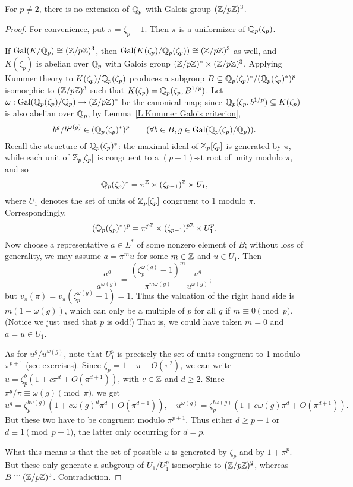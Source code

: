 \begin{lemma} \label{lem:three}
For $p \neq 2$, there is no extension of $\mathbb{Q}_p$ with 
Galois group $(\mathbb{Z}/p\mathbb{Z})^3$.
\end{lemma}
\begin{proof}
For convenience, put $\pi = \zeta_p - 1$. Then $\pi$ is a uniformizer of
$\mathbb{Q}_p(\zeta_p)$.

If $\operatorname{Gal}(K/\mathbb{Q}_p) \cong (\mathbb{Z}/p\mathbb{Z})^3$, then
$\operatorname{Gal}(K(\zeta_p)/\mathbb{Q}_p(\zeta_p)) \cong (\mathbb{Z}/p\mathbb{Z})^3$ as well,
and $K(\zeta_p)$ is abelian over $\mathbb{Q}_p$ with Galois group
$(\mathbb{Z}/p\mathbb{Z})^* \times (\mathbb{Z}/p\mathbb{Z})^3$. Applying
Kummer theory to $K(\zeta_p)/\mathbb{Q}_p(\zeta_p)$ produces a subgroup $B
\subseteq \mathbb{Q}_p(\zeta_p)^*/(\mathbb{Q}_p(\zeta_p)^*)^p$ isomorphic to
$(\mathbb{Z}/p\mathbb{Z})^3$ such that $K(\zeta_p) = \mathbb{Q}_p(\zeta_p, B^{1/p})$.
Let $\omega: \operatorname{Gal}(\mathbb{Q}_p(\zeta_p)/\mathbb{Q}_p) \to (\mathbb{Z}/p\mathbb{Z})^*$ be the
canonical map; since $\mathbb{Q}_p(\zeta_p, b^{1/p}) \subseteq K(\zeta_p)$ is also
abelian over $\mathbb{Q}_p$, by Lemma~\ref{L:Kummer Galois criterion},
\[
b^g/b^{\omega(g)} \in (\mathbb{Q}_p(\zeta_p)^*)^p \qquad
(\forall b \in B, g \in \operatorname{Gal}(\mathbb{Q}_p(\zeta_p)/\mathbb{Q}_p)).
\]
Recall the structure of $\mathbb{Q}_p(\zeta_p)^*$: the maximal ideal of
$\mathbb{Z}_p[\zeta_p]$ is generated by $\pi$, while
each unit of $\mathbb{Z}_p[\zeta_p]$ is congruent to a $(p-1)$-st root of unity modulo
$\pi$, and so
\[
\mathbb{Q}_p(\zeta_p)^* = \pi^{\mathbb{Z}} \times (\zeta_{p-1})^{\mathbb{Z}} \times U_1,
\]
where $U_1$ denotes the set of units of $\mathbb{Z}_p[\zeta_p]$ congruent to
1 modulo $\pi$. Correspondingly,
\[
(\mathbb{Q}_p(\zeta_p)^*)^p = \pi^{p\mathbb{Z}} \times (\zeta_{p-1})^{p\mathbb{Z}}
\times U_1^p.
\]
Now choose a representative $a \in L^*$ of some nonzero
element of $B$; without
loss of generality, we may assume $a = \pi^m u$ for some
$m \in \mathbb{Z}$ and $u \in U_1$. Then
\[
\frac{a^g}{a^{\omega(g)}}
= \frac{(\zeta_p^{\omega(g)}-1)^m}{\pi^{m\omega(g)}} \frac{u^g}{u^{\omega(g)}};
\]
but $v_\pi(\pi) = v_\pi(\zeta_p^{\omega(g)}-1) = 1$. Thus 
the valuation of the right hand side is $m(1-\omega(g))$, which can only
be a multiple of $p$ for all $g$ if $m \equiv 0 \pmod{p}$. (Notice we
just used that $p$ is odd!) That is,
we could have taken $m=0$ and $a = u \in U_1$.

As for $u^g/u^{\omega(g)}$, note that $U_1^p$ is precisely the set of units
congruent to 1 modulo $\pi^{p+1}$ (see exercises).
Since $\zeta_p = 1 + \pi + O(\pi^2)$, we can write
$u = \zeta_p^b(1 + c\pi^d + O(\pi^{d+1}))$, with $c \in \mathbb{Z}$
and $d \geq 2$. Since $\pi^g/\pi \equiv \omega(g) \pmod{\pi}$, we get
\[
u^g = \zeta_p^{b\omega(g)} (1 + c \omega(g)^d \pi^d + O(\pi^{d+1})),
\quad
u^{\omega(g)} = \zeta_p^{b\omega(g)} (1 + c \omega(g) \pi^d + O(\pi^{d+1})).
\]
But these two have to be congruent modulo $\pi^{p+1}$. Thus either
$d \geq p+1$ or $d \equiv 1 \pmod{p-1}$, the latter only occurring for
$d=p$.

What this means is that the set of possible $u$ is generated by
$\zeta_p$ and by $1 + \pi^p$. But these only generate a subgroup of
$U_1/U_1^p$ isomorphic to $(\mathbb{Z}/p\mathbb{Z})^2$, whereas $B \cong (\mathbb{Z}/p\mathbb{Z})^3$.
Contradiction.
\end{proof}

